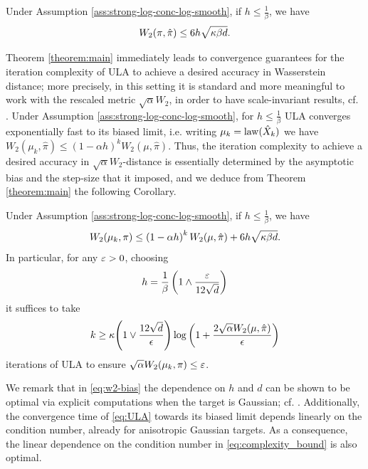 \documentclass[11pt,a4paper]{article}
\begin{document}
    
    \begin{theorem}\label{theorem:main}
    Under Assumption \ref{ass:strong-log-conc-log-smooth}, if  $h\le \frac1\beta$, we have
    \begin{equation}\label{eq:w2-bias}
        W_2\tond*{\pi, \hat\pi} \le  6 h \sqrt{\kappa \beta  d}.
    \end{equation}
    \end{theorem}
    Theorem \ref{theorem:main} immediately leads to convergence guarantees for the iteration complexity of ULA to achieve a desired accuracy in Wasserstein distance; more precisely, in this setting it is standard and more meaningful to work with the rescaled metric $\sqrt{\alpha}W_2$, in order to have scale-invariant results, cf. \cite[Remark 4.1.4]{Chewi26Book}.
    Under Assumption \ref{ass:strong-log-conc-log-smooth}, for $h\le \frac1\beta$ ULA converges exponentially fast to its biased limit, i.e. writing $\mu_k = \operatorname{law}(\hat{X}_k)$ we have $W_2(\mu_k,\hat \pi) \le (1-\alpha h)^{k}W_2(\mu,\hat{\pi})$.
    Thus, the iteration complexity to achieve a desired accuracy in $\sqrt{\alpha}W_2$-distance is essentially determined by the asymptotic bias and the step-size that it imposed, and 
    we deduce from Theorem \ref{theorem:main} the following Corollary.
    \begin{corollary}
        Under Assumption \ref{ass:strong-log-conc-log-smooth}, if  $h\le \frac1\beta$, we have
    \begin{equation}\label{eq:w2-convergence}
        W_2\tond*{\mu_k, \pi} \le \left(1-\alpha h\right)^{k} W_2(\mu,\hat{\pi}) + 6 h \sqrt{\kappa \beta  d}.
    \end{equation}
    In particular, for any $\varepsilon>0$, choosing \[
    h = \frac{1}{\beta}\left(1 \wedge \frac{\varepsilon}{12\sqrt{d}}\right)
    \]
    it suffices to take
    \begin{equation}\label{eq:complexity_bound}
    k \geq \kappa \tond*{1 \vee \frac{12\sqrt{d}}{\epsilon}}\log\left(1 + \frac{2\sqrt{\alpha}W_{2}(\mu,\hat{\pi})}{\epsilon}\right)
    \end{equation}
    iterations of ULA to ensure $\sqrt{\alpha}W_2(\mu_k,\pi) \le \varepsilon$.
    \end{corollary}
   We remark that in \eqref{eq:w2-bias} the dependence on $h$ and $d$ can be shown to be optimal via explicit computations when the target is Gaussian; cf. \cite[Example 2]{wibisono2018sampling}. Additionally, the convergence time of \eqref{eq:ULA} towards its biased limit depends linearly on the condition number, already for anisotropic Gaussian targets. As a consequence, the linear dependence on the condition number in \eqref{eq:complexity_bound} is also optimal.
\end{document}
